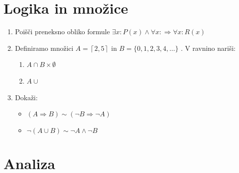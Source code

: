\documentclass[a4paper,12pt]{article}
\begin{document}

\section*{Logika in množice}

\begin{enumerate}
\item
Poišči preneksno obliko formule $\exists x: P(x)\land\forall x: \Rightarrow \forall x : R(x)  $

\item
Definiramo množici $A = \left\lceil 2,5\right\rceil  $ in $B = \{0,1,2,3,4,\dots \}$ .
V ravnino nariši:
\begin{enumerate}
\item $  A\cap B\times \emptyset $
\item $  A\cup $
\end{enumerate}

\item
Dokaži:
\begin{itemize}
\item $(A\Rightarrow B) \sim (\neg B \Rightarrow \neg A) $
\item $\neg(A \cup B) \sim \neg A \land \neg B$
\end{itemize}
\end{enumerate}

\section*{Analiza}
\end{document}
